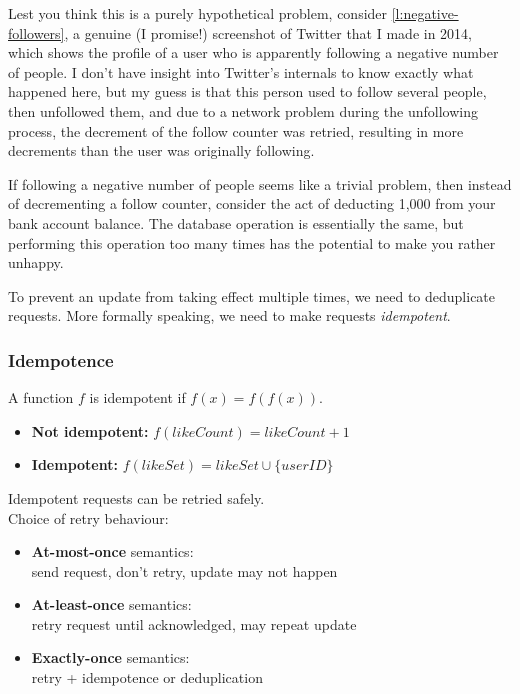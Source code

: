 Lest you think this is a purely hypothetical problem, consider \autoref{l:negative-followers}, a genuine (I promise!) screenshot of Twitter that I made in 2014, which shows the profile of a user who is apparently following a negative number of people.
I don't have insight into Twitter's internals to know exactly what happened here, but my guess is that this person used to follow several people, then unfollowed them, and due to a network problem during the unfollowing process, the decrement of the follow counter was retried, resulting in more decrements than the user was originally following.

If following a negative number of people seems like a trivial problem, then instead of decrementing a follow counter, consider the act of deducting {\textsterling}1,000 from your bank account balance.
The database operation is essentially the same, but performing this operation too many times has the potential to make you rather unhappy.

To prevent an update from taking effect multiple times, we need to deduplicate requests.
More formally speaking, we need to make requests \emph{idempotent}.

\begin{frame}
    \label{s:idempotence}
    \frametitle{Idempotence}
    A function $f$ is idempotent if $f(x) = f(f(x))$.
    \begin{itemize}
        \item \textbf{Not idempotent:} $f(\mathit{likeCount}) = \mathit{likeCount} + 1$
        \item \textbf{Idempotent:} $f(\mathit{likeSet}) = \mathit{likeSet} \cup \{\mathit{userID}\}$
    \end{itemize}
    Idempotent requests can be retried safely.\\[1em]\pause
    Choice of retry behaviour:
    \begin{itemize}
        \item \textbf{At-most-once} semantics:\\
            send request, don't retry, update may not happen
        \item \textbf{At-least-once} semantics:\\
            retry request until acknowledged, may repeat update
        \item \textbf{Exactly-once} semantics:\\
            retry + idempotence or deduplication
    \end{itemize}
\end{frame}
\label{l:idempotence}

